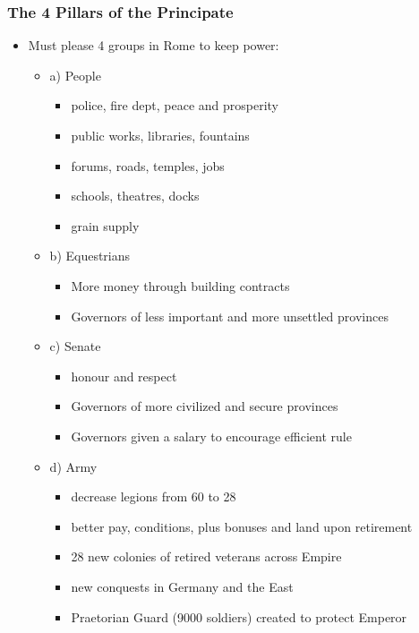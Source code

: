 \documentclass[12pt, twoside]{article}
\begin{document}
\subsubsection{The 4 Pillars of the Principate}
\begin{itemize}
\item Must please 4 groups in Rome to keep power:
	\begin{itemize}
	\item a) People
		\begin{itemize}
		\item police, fire dept, peace and prosperity
		\item public works, libraries, fountains
		\item forums, roads, temples, jobs
		\item schools, theatres, docks
		\item grain supply
		\end{itemize}
	\item b) Equestrians
		\begin{itemize}
		\item More money through building contracts
		\item Governors of less important and more unsettled provinces
		\end{itemize}
	\item c) Senate
		\begin{itemize}
		\item honour and respect
		\item Governors of more civilized and secure provinces
		\item Governors given a salary to encourage efficient rule
		\end{itemize}
	\item d) Army
		\begin{itemize}
		\item decrease legions from 60 to 28
		\item better pay, conditions, plus bonuses and land upon retirement
		\item 28 new colonies of retired veterans across Empire
		\item new conquests in Germany and the East
		\item Praetorian Guard (9000 soldiers) created to protect Emperor
		\end{itemize}
	\end{itemize}
\end{itemize}
\end{document}
